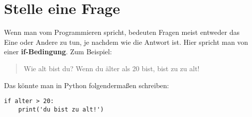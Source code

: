 

\chapter{Stelle eine Frage}\label{ch:howtoaskaquestion}

Wenn man vom Programmieren spricht, bedeuten Fragen meist entweder das Eine oder Andere zu tun, je nachdem wie die Antwort ist. Hier spricht man von einer \textbf{if-Bedingung}. Zum Beispiel:

\begin{quotation}
Wie alt bist du? Wenn du älter als 20 bist, bist zu zu alt!
\end{quotation}

Das könnte man in Python folgendermaßen schreiben:

\begin{listing}
\begin{verbatim}
if alter > 20:
    print('du bist zu alt!')
\end{verbatim}
\end{listing}


